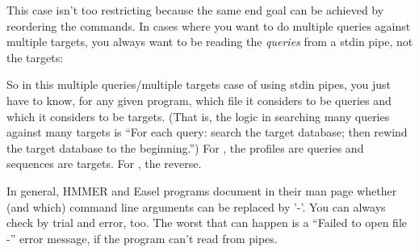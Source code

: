 This case isn't too restricting because the same end goal can be
achieved by reordering the commands. In cases where you want to do
multiple queries against multiple targets, you always want to be
reading the \emph{queries} from a stdin pipe, not the targets:



So in this multiple queries/multiple targets case of using stdin
pipes, you just have to know, for any given program, which file it
considers to be queries and which it considers to be targets. (That
is, the logic in searching many queries against many targets is ``For
each query: search the target database; then rewind the target
database to the beginning.'') For , the profiles are
queries and sequences are targets. For , the reverse.

In general, HMMER and Easel programs document in their man page
whether (and which) command line arguments can be replaced by '-'.
You can always check by trial and error, too. The worst that can
happen is a ``Failed to open file -'' error message, if the program
can't read from pipes.


